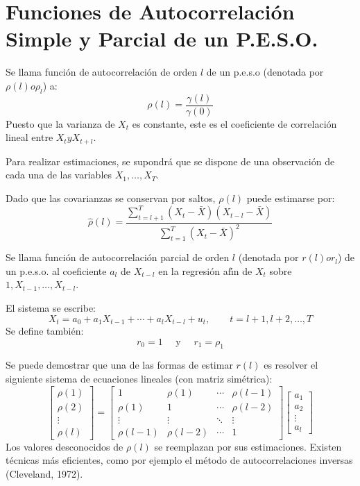 \section{Funciones de Autocorrelaci\'{o}n Simple y Parcial de un P.E.S.O.}

\begin{definicion}
 Se llama funci\'{o}n de autocorrelaci\'{o}n de orden $l$ de un p.e.s.o (denotada por $\rho \left( l \right) o \rho_{l}$) a:
\[
\rho \left( l \right)=\frac{\gamma (l)}{\gamma (0)}
\]
Puesto que la varianza de $X_{t}$ es constante, este es el coeficiente de correlaci\'{o}n lineal entre $X_{t} y X_{t+l}$.
\end{definicion}

\begin{observacion}
 Para realizar estimaciones, se supondr\'{a} que se dispone de una observaci\'{o}n de cada una de las variables $X_{1},\ldots, X_{T}$.\newline

Dado que las covarianzas se conservan por saltos, $\rho \left( l \right)$ puede estimarse por:
\[
\widehat{\rho }(l)=\frac{\displaystyle \sum_{t=l+1}^T (X_{t}-\bar{X})(X_{t-l}-\bar{X}) }{\displaystyle \sum_{t=1}^T (X_{t}-\bar{X})^{2} }
\]
\end{observacion}

\begin{definicion}
 Se llama funci\'{o}n de autocorrelaci\'{o}n parcial de orden $l$ (denotada por $r\left( l \right)o r_{l}$) de 
un p.e.s.o. al coeficiente $a_{l}$ de $X_{t-l}$ en la regresi\'{o}n 
af\'{\i}n de $X_{t}$ sobre $1,X_{t-1},\ldots,X_{t-l}$.
\end{definicion}

El sistema se escribe:
\[
X_{t}=a_{0}+a_{1}X_{t-1}+\cdots +a_{l}X_{t-l}+u_{t}, \qquad
 t=l+1, l+2,\ldots ,T
\]
Se define tambi\'{e}n:
\[
 r_{0} =1\quad\text{ y }\quad r_{1} =\rho_{1}
\]

Se puede demostrar que una de las formas de estimar $r(l)$ es resolver el 
siguiente sistema de ecuaciones lineales (con matriz sim\'{e}trica):
\[
\begin{bmatrix}
	\rho (1)\\
	\rho (2)\\
	\vdots \\
	\rho (l)
\end{bmatrix}
=
\begin{bmatrix}
	1 & \rho(1) & \cdots & \rho (l-1)\\
	\rho(1) & 1 & \cdots & \rho (l-2)\\
	\vdots & \vdots &\ddots & \vdots \\
	\rho (l-1) & \rho (l-2) & \cdots & 1
\end{bmatrix}
\begin{bmatrix}
	a_{1}\\
	a_{2}\\
	\vdots \\
	a_{l}
\end{bmatrix}
\]
Los valores desconocidos de $\rho \left( l \right)$ se reemplazan por sus 
estimaciones. Existen t\'{e}cnicas m\'{a}s eficientes, como por ejemplo el 
m\'{e}todo de autocorrelaciones inversas (Cleveland, 1972).


